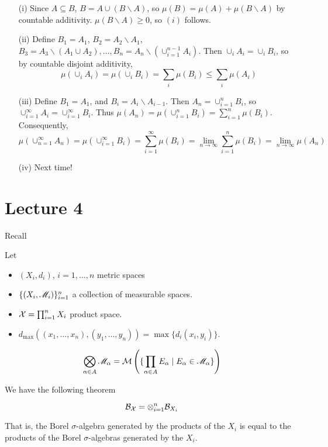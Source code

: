 \documentclass[x11names,reqno,14pt]{extarticle}
\newcommand*{\oo}{\infty}
\begin{document}
\proof
\begin{enumerate}
\item[(i)] Since $A \subseteq B$, $B = A \cup (B\backslash A)$, so $\mu(B) = \mu(A) + \mu(B\backslash A)$ by countable additivity. $\mu(B\backslash A) \geq 0$, so $(i)$ follows. 
\item[(ii)] Define $B_1 = A_1$, $B_2 = A_2 \backslash A_1$, $B_3 = A_3 \backslash (A_1 \cup A_2), \dots, B_n = A_n\backslash(\cup_{i=1}^{n - 1}A_i)$.
Then $\cup_i A_i = \cup_i B_i$, so by countable disjoint additivity, 
\[
\mu(\cup_i A_i) = \mu(\cup_i B_i) = \sum_i\mu(B_i) \leq \sum_i\mu(A_i)
\]
\item[(iii)] Define $B_1 = A_1$, and $B_i = A_i \backslash A_{i - 1}$. Then $A_n = \cup_{i=1}^nB_i$, so $\cup_{i=1}^\oo A_i= \cup_{i=1}^\oo B_i$. Thus $\mu(A_n) = \mu(\cup_{i=1}^nB_i) = \sum_{i=1}^n\mu(B_i)$. Consequently, 
\[
\mu(\cup_{n=1}^\oo A_n) = \mu(\cup_{i=1}^\oo B_i) = \sum_{i=1}^\oo\mu(B_i) = \lim_{n\to\oo}\sum_{i=1}^n\mu(B_i) = \lim_{n\to\oo}\mu(A_n)
\]
\item[(iv)] Next time!
\end{enumerate}

\section*{Lecture 4}

Recall

Let
\begin{itemize}
\item $(X_i, d_i)$, $i = 1, \dots, n$ metric spaces
\item $\{(X_i, \mathscr{M}_i)\}_{i=1}^n$ a collection of measurable spaces. 
\item $\mathcal{X} = \prod_{i=1}^nX_i$ product space. 
\item $d_{\max}((x_1, \dots, x_n), (y_1, \dots, y_n)) = \max\{d_i(x_i, y_i)\}$. 
\end{itemize}


\[
\bigotimes_{\alpha\in A}\mathscr{M}_\alpha = \mathcal{M}\left(\{\prod_{\alpha\in A}E_\alpha \mid E_\alpha \in \mathscr{M}_\alpha\}\right)
\]

We have the following theorem

\thm 

\[
\mathcal{B}_{\mathcal{X}} = \otimes_{i=1}^n\mathcal{B}_{X_i}
\]

That is, the Borel $\sigma$-algebra generated by the products of the $X_i$ is equal to the products of the Borel $\sigma$-algebras generated by the $X_i$. 
\end{document}
